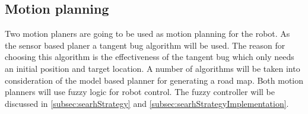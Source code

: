 \documentclass[../Head/Main.tex]{subfiles}
\begin{document}
\subsection{Motion planning}

Two motion planers are going to be used as motion planning for the robot. As the sensor based planer a tangent bug algorithm will be used. The reason for choosing this algorithm is the effectiveness of the tangent bug which only needs an initial position and target location. A number of algorithms will be taken into consideration of the model based planner for generating a road map. Both motion planners will use fuzzy logic for robot control. The fuzzy controller will be discussed in \ref{subsec:searhStrategy} and \ref{subsec:searhStrategyImplementation}.   



\end{document}
